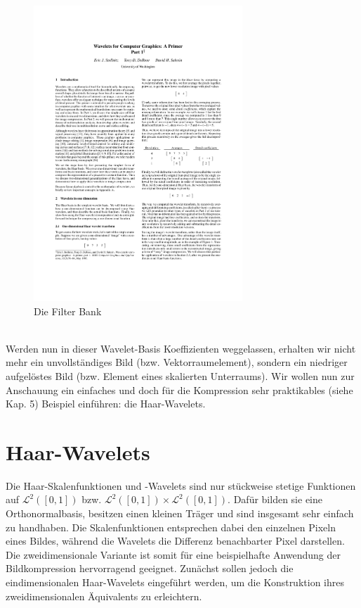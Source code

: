 \begin{figure}[h]
	\centering
	\includegraphics[page=11, trim=60 695 305 100, clip, width=0.7\textwidth]{4_wavelet_final[14255].pdf}
	\caption{Die Filter Bank}
\end{figure}\\
Werden nun in dieser Wavelet-Basis Koeffizienten weggelassen, erhalten wir nicht mehr ein unvollständiges Bild (bzw. Vektorraumelement), sondern ein niedriger aufgelöstes Bild (bzw. Element eines skalierten Unterraums). Wir wollen nun zur Anschauung ein einfaches und doch für die Kompression sehr praktikables (siehe Kap. 5) Beispiel einführen: die Haar-Wavelets.


\section{Haar-Wavelets}

Die Haar-Skalenfunktionen und -Wavelets sind nur stückweise stetige Funktionen auf $\mathcal{L}^2([0,1])$ bzw. $\mathcal{L}^2([0,1])\times\mathcal{L}^2([0,1])$. Dafür bilden sie eine Orthonormalbasis, besitzen einen kleinen Träger und sind insgesamt sehr einfach zu handhaben. Die Skalenfunktionen entsprechen dabei den einzelnen Pixeln eines Bildes, während die Wavelets die Differenz benachbarter Pixel darstellen. Die zweidimensionale Variante ist somit für eine beispielhafte Anwendung der Bildkompression hervorragend geeignet. Zunächst sollen jedoch die eindimensionalen Haar-Wavelets eingeführt werden, um die Konstruktion ihres zweidimensionalen Äquivalents zu erleichtern.

